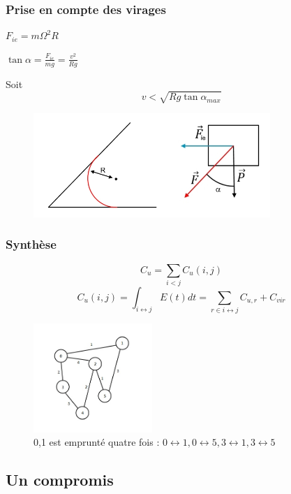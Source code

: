 \documentclass{beamer}[11pt]
\begin{document}
			\begin{frame}
				\frametitle{Prise en compte des virages}

				$F_{ie} = m \Omega^{2} R$

				$\tan \alpha = \frac{F_{ie}}{mg} = \frac{v^{2}}{Rg}$

				Soit $$v < \sqrt{Rg \tan \alpha_{max}}$$

				\begin{figure}[t]
					\centering
						\includegraphics[width=0.8\textwidth]{Pics/forvir.jpg}
				\end{figure}
			\end{frame}

			\begin{frame}
				\frametitle{Synthèse}

				$$C_{u} = \sum_{i < j}{C_{u}(i,j)}$$
				$$C_{u}(i,j) = \int_{i \leftrightarrow j}{E(t)dt} = \sum_{r \in i \leftrightarrow j}{C_{u,r}} + C_{vir}$$

				\begin{figure}[t]
					\centering
						\includegraphics[width=0.4\textwidth]{Pics/grph.jpg}
						\caption{{0,1} est emprunté quatre fois : $0 \leftrightarrow 1, 0 \leftrightarrow 5, 3 \leftrightarrow 1, 3 \leftrightarrow 5$}
				\end{figure}
			\end{frame}

		\subsection{Un compromis}
\end{document}
